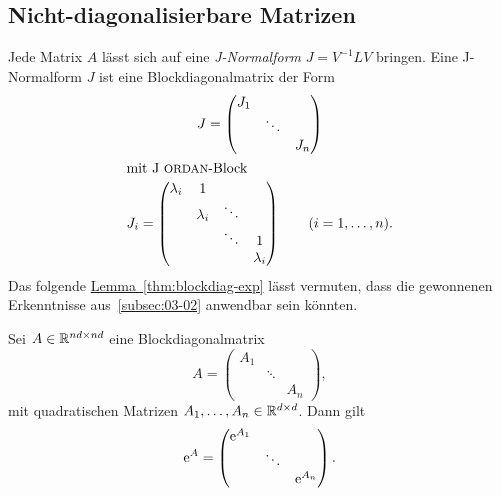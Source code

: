 \subsection{Nicht-diagonalisierbare Matrizen}\label{subsec:03-03}
Jede Matrix $A$ lässt sich auf eine \emph{J-Normalform} $J = V^{-1} L V$ bringen.
Eine J-Normalform $J$ ist eine Blockdiagonalmatrix der Form
\begin{gather*}
    J = \begin{pmatrix}
            J_1 &        &  \\
                & \ddots & \\
                &        & J_n
    \end{pmatrix}\\
    \intertext{mit J\textc{ordan}-Block}
    J_i = \begin{pmatrix}
              \lambda_i & 1         &        & \\
                        & \lambda_i & \ddots & \\
                        &           & \ddots & 1 \\
                        &           &        & \lambda_i
    \end{pmatrix}
    \qquad (i = 1,\dots,n).
\end{gather*}
Das folgende \hyperref[thm:blockdiag-exp]{Lemma~\ref*{thm:blockdiag-exp}} lässt vermuten,
dass die gewonnenen Erkenntnisse aus~\autoref{subsec:03-02} anwendbar sein könnten.

\begin{lemma}\label{thm:blockdiag-exp}
    Sei $A \in \mathbb{R}^{nd \times nd}$ eine Blockdiagonalmatrix
    \begin{equation*}
        A = \begin{pmatrix}
                A_1 &        & \\
                    & \ddots & \\
                    &        & A_n
        \end{pmatrix},
    \end{equation*}
    mit quadratischen Matrizen $A_1, \dots, A_n \in \mathbb{R}^{d \times d}$.
    Dann gilt
    \begin{equation*}
        \mathrm{e}^A = \begin{pmatrix}
                   \mathrm{e}^{A_1} &        & \\
                            & \ddots & \\
                            &        & \mathrm{e}^{A_n}
        \end{pmatrix}.
    \end{equation*}
\end{lemma}

